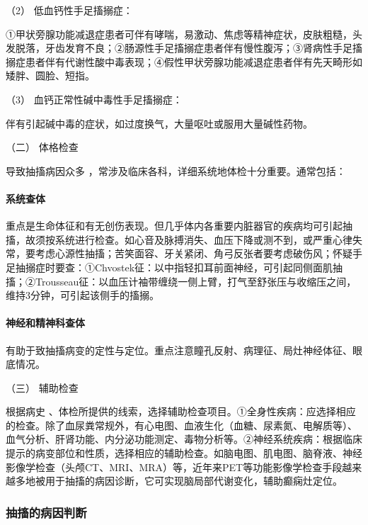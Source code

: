 \hypertarget{text00016.htmlux5cux23CHP1-5-2-1-1-3-2}{}
（2） 低血钙性手足搐搦症：

①甲状旁腺功能减退症患者可伴有哮喘，易激动、焦虑等精神症状，皮肤粗糙，头发脱落，牙齿发育不良；②肠源性手足搐搦症患者伴有慢性腹泻；③肾病性手足搐搦症患者伴有代谢性酸中毒表现；④假性甲状旁腺功能减退症患者伴有先天畸形如矮胖、圆脸、短指。

\hypertarget{text00016.htmlux5cux23CHP1-5-2-1-1-3-3}{}
（3） 血钙正常性碱中毒性手足搐搦症：

伴有引起碱中毒的症状，如过度换气，大量呕吐或服用大量碱性药物。

\hypertarget{text00016.htmlux5cux23CHP1-5-2-1-2}{}
（二） 体格检查

导致抽搐病因众多 ，常涉及临床各科，详细系统地体检十分重要。通常包括：

\paragraph{系统查体}

重点是生命体征和有无创伤表现。但几乎体内各重要内脏器官的疾病均可引起抽搐，故须按系统进行检查。如心音及脉搏消失、血压下降或测不到，或严重心律失常，要考虑心源性抽搐；苦笑面容、牙关紧闭、角弓反张者要考虑破伤风；怀疑手足抽搦症时要查：①Chvostek征：以中指轻扣耳前面神经，可引起同侧面肌抽搐；②Trousseau征：以血压计袖带缠绕一侧上臂，打气至舒张压与收缩压之间，维持3分钟，可引起该侧手的搐搦。

\paragraph{神经和精神科查体}

有助于致抽搐病变的定性与定位。重点注意瞳孔反射、病理征、局灶神经体征、眼底情况。

\hypertarget{text00016.htmlux5cux23CHP1-5-2-1-3}{}
（三） 辅助检查

根据病史
、体检所提供的线索，选择辅助检查项目。①全身性疾病：应选择相应的检查。除了血尿粪常规外，有心电图、血液生化（血糖、尿素氮、电解质等）、血气分析、肝肾功能、内分泌功能测定、毒物分析等。②神经系统疾病：根据临床提示的病变部位和性质，选择相应的辅助检查。如脑电图、肌电图、脑脊液、神经影像学检查（头颅CT、MRI、MRA）等，近年来PET等功能影像学检查手段越来越多地被用于抽搐的病因诊断，它可实现脑局部代谢变化，辅助癫痫灶定位。

\subsubsection{抽搐的病因判断}

